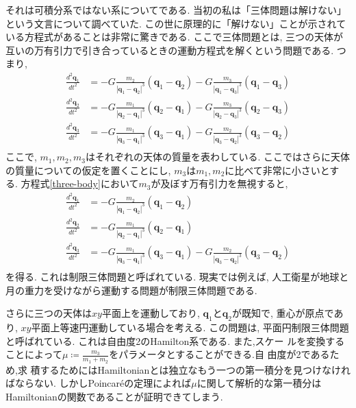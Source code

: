 \documentclass{ltjsarticle}
\theoremstyle{definition}
\numberwithin{thm}{section}
\theoremstyle{definition}
\numberwithin{prop}{section}
\theoremstyle{definition}
\numberwithin{dfn}{section}
\numberwithin{equation}{section}
\begin{document}
それは可積分系ではない系についてである. 当初の私は「三体問題は解けない」という文言について調べていた. この世に原理的に「解けない」ことが示されている方程式があることは非常に驚きである. ここで三体問題とは, 三つの天体が互いの万有引力で引き合っているときの運動方程式を解くという問題である. つまり,
\begin{equation} \label{three-body}
    \begin{aligned}
        \frac{d^2\bm{q}_1}{dt^2}&=-G\frac{m_2}{|\bm{q}_1-\bm{q}_2|^3}(\bm{q}_1-\bm{q}_2)-G\frac{m_3}{|\bm{q}_1-\bm{q}_3|^3}(\bm{q}_1-\bm{q}_3)\\
        \frac{d^2\bm{q}_2}{dt^2}&=-G\frac{m_1}{|\bm{q}_2-\bm{q}_1|^3}(\bm{q}_2-\bm{q}_1)-G\frac{m_3}{|\bm{q}_2-\bm{q}_3|^3}(\bm{q}_2-\bm{q}_3)\\
        \frac{d^2\bm{q}_3}{dt^2}&=-G\frac{m_1}{|\bm{q}_3-\bm{q}_1|^3}(\bm{q}_3-\bm{q}_1)-G\frac{m_2}{|\bm{q}_3-\bm{q}_2|^3}(\bm{q}_3-\bm{q}_2)\\
    \end{aligned}
\end{equation}
ここで, $m_1,m_2,m_3$はそれぞれの天体の質量を表わしている. ここではさらに天体の質量についての仮定を置くことにし, $m_3$は$m_1,m_2$に比べて非常に小さいとする. 方程式\ref{three-body}において$m_3$が及ぼす万有引力を無視すると,
\begin{equation} \label{restricted-three-body}
    \begin{aligned}
        \frac{d^2\bm{q}_1}{dt^2}&=-G\frac{m_2}{|\bm{q}_1-\bm{q}_2|^3}(\bm{q}_1-\bm{q}_2)\\
        \frac{d^2\bm{q}_2}{dt^2}&=-G\frac{m_1}{|\bm{q}_2-\bm{q}_1|^3}(\bm{q}_2-\bm{q}_1)\\
        \frac{d^2\bm{q}_3}{dt^2}&=-G\frac{m_1}{|\bm{q}_3-\bm{q}_1|^3}(\bm{q}_3-\bm{q}_1)-G\frac{m_2}{|\bm{q}_3-\bm{q}_2|^3}(\bm{q}_3-\bm{q}_2)\\
    \end{aligned}
\end{equation}
を得る. これは制限三体問題と呼ばれている. 現実では例えば, 人工衛星が地球と月の重力を受けながら運動する問題が制限三体問題である.

さらに三つの天体は$xy$平面上を運動しており, $\bm{q}_1$と$\bm{q}_2$が既知で, 重心が原点であり, $xy$平面上等速円運動している場合を考える. この問題は, 平面円制限三体問題と呼ばれている. これは自由度2のHamilton系である. また,スケー ルを変換することによって$\mu\coloneq \frac{m_3}{m_1+m_2}$をパラメータとすることができる.自 由度が2であるため,求 積するためにはHamiltonianとは独立なもう一つの第一積分を見つけなければならない. しかしPoincar\'eの定理によれば$\mu$に関して解析的な第一積分はHamiltonianの関数であることが証明できてしまう.
\end{document}
